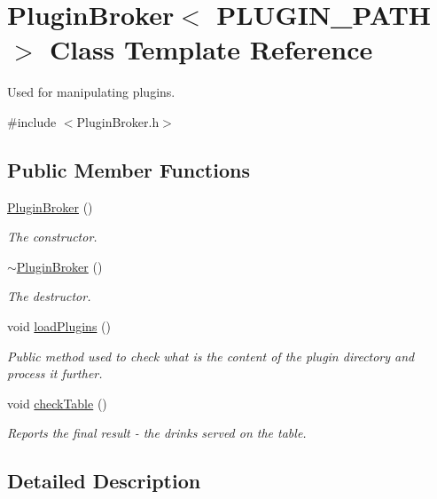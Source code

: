 \hypertarget{classPluginBroker}{}\section{Plugin\+Broker$<$ P\+L\+U\+G\+I\+N\+\_\+\+P\+A\+TH $>$ Class Template Reference}
\label{classPluginBroker}


Used for manipulating plugins.  




{\ttfamily \#include $<$Plugin\+Broker.\+h$>$}

\subsection*{Public Member Functions}
\begin{DoxyCompactItemize}
\item 
\hyperlink{classPluginBroker_a018134440a6cb4b7440d3e700499cd21}{Plugin\+Broker} ()
\begin{DoxyCompactList}\small\item\em The constructor. \end{DoxyCompactList}\item 
\hyperlink{classPluginBroker_afd38dbcd03f96b4249bf4e4a67cfdf76}{$\sim$\+Plugin\+Broker} ()
\begin{DoxyCompactList}\small\item\em The destructor. \end{DoxyCompactList}\item 
void \hyperlink{classPluginBroker_a82e9d16e67c3822218b441e76f294539}{load\+Plugins} ()
\begin{DoxyCompactList}\small\item\em Public method used to check what is the content of the plugin directory and process it further. \end{DoxyCompactList}\item 
void \hyperlink{classPluginBroker_a8444a6a0398adf9f5519f057e697a7fa}{check\+Table} ()
\begin{DoxyCompactList}\small\item\em Reports the final result -\/ the drinks served on the table. \end{DoxyCompactList}\end{DoxyCompactItemize}


\subsection{Detailed Description}
